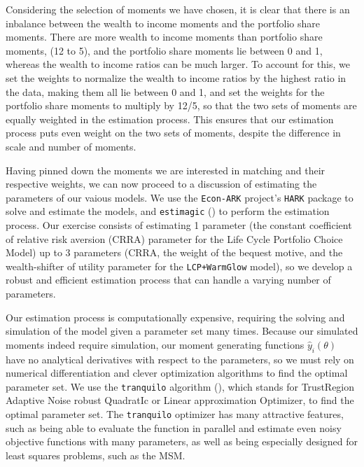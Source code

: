 \documentclass{article}
\begin{document}
Considering the selection of moments we have chosen, it is clear that there is an inbalance between the wealth to income moments and the portfolio share moments. There are more wealth to income moments than portfolio share moments, (12 to 5), and the portfolio share moments lie between 0 and 1, whereas the wealth to income ratios can be much larger. To account for this, we set the weights to normalize the wealth to income ratios by the highest ratio in the data, making them all lie between 0 and 1, and set the weights for the portfolio share moments to multiply by 12/5, so that the two sets of moments are equally weighted in the estimation process. This ensures that our estimation process puts even weight on the two sets of moments, despite the difference in scale and number of moments.

Having pinned down the moments we are interested in matching and their respective weights, we can now proceed to a discussion of estimating the parameters of our vaious models. We use the \texttt{Econ-ARK} project's \texttt{HARK} package to solve and estimate the models, and \texttt{estimagic} (\cite{Gabler2022}) to perform the estimation process. Our exercise consists of estimating 1 parameter (the constant coefficient of relative risk aversion (CRRA) parameter for the Life Cycle Portfolio Choice Model) up to 3 parameters (CRRA, the weight of the bequest motive, and the wealth-shifter of utility parameter for the \texttt{LCP+WarmGlow} model), so we develop a robust and efficient estimation process that can handle a varying number of parameters. 

Our estimation process is computationally expensive, requiring the solving and simulation of the model given a parameter set many times. Because our simulated moments indeed require simulation, our moment generating functions $\hat{y}_i(\theta)$ have no analytical derivatives with respect to the parameters, so we must rely on numerical differentiation and clever optimization algorithms to find the optimal parameter set. We use the \texttt{tranquilo} algorithm (\cite{Gabler2024}), which stands for TrustRegion Adaptive Noise robust QuadratIc or Linear approximation Optimizer, to find the optimal parameter set. The \texttt{tranquilo} optimizer has many attractive features, such as being able to evaluate the function in parallel and estimate even noisy objective functions with many parameters, as well as being especially designed for least squares problems, such as the MSM.
\end{document}
